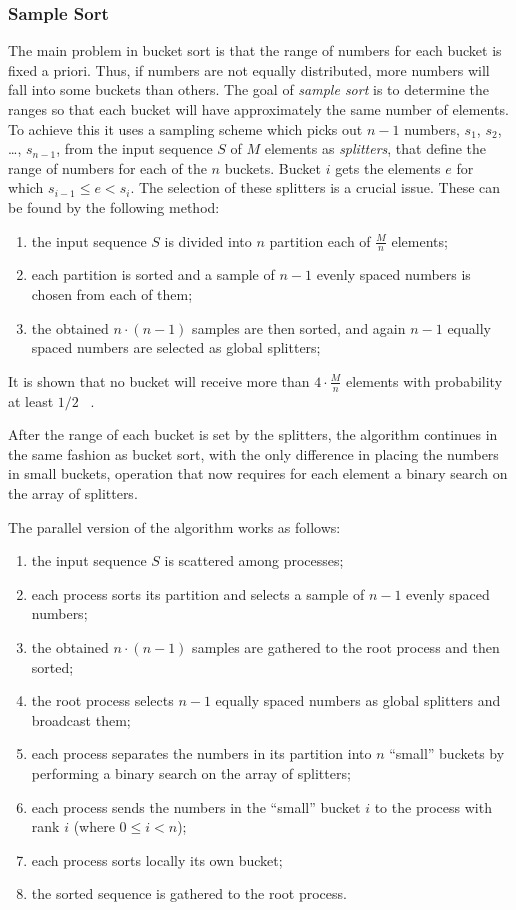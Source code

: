 \subsubsection{Sample Sort}
\label{Samplesort}
The main problem in bucket sort is that the range of numbers for each bucket is fixed a priori. Thus, if numbers are not equally distributed, more numbers will fall into some buckets than others.
The goal of \textit{sample sort} is to determine the ranges so that each bucket will have approximately the same number of elements. To achieve this it uses a sampling scheme which picks out $n-1$ numbers, $s_1$, $s_2$, \dots, $s_{n-1}$, from the input sequence $S$ of $M$ elements as \textit{splitters}, that define the range of numbers for each of the $n$ buckets. Bucket $i$ gets the elements $e$ for which $s_{i-1} \leq e < s_i$. The selection of these splitters is a crucial issue. These can be found by the following method:
\begin{enumerate}	
	\item the input sequence $S$ is divided into $n$ partition each of $\frac{M}{n}$ elements;
	\item each partition is sorted and a sample of $n-1$ evenly spaced numbers is chosen from each of them;
	\item the obtained $n \cdot (n-1)$ samples are then sorted, and again $n-1$ equally spaced numbers are selected as global splitters;
\end{enumerate}
It is shown that no bucket will receive more than $4 \cdot \frac{M}{n}$ elements with probability at least $1/2$ ~\cite{SAN}.

After the range of each bucket is set by the splitters, the algorithm continues in the same fashion as bucket sort, with the only difference in placing the numbers in small buckets, operation that now requires for each element a binary search on the array of splitters.

The parallel version of the algorithm works as follows:
\begin{enumerate}	
	\item the input sequence $S$ is scattered among processes;
	\item each process sorts its partition and selects a sample of $n-1$ evenly spaced numbers;
	\item the obtained $n \cdot (n-1)$ samples are gathered to the root process and then sorted;
	\item the root process selects $n-1$ equally spaced numbers as global splitters and broadcast them;
	\item each process separates the numbers in its partition into $n$ ``small'' buckets by performing a binary search on the array of splitters;
	\item each process sends the numbers in the ``small'' bucket $i$ to the process with rank $i$ (where $0 \leq i < n$);
	\item each process sorts locally its own bucket;
	\item the sorted sequence is gathered to the root process.
\end{enumerate}
